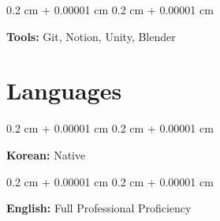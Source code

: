 \documentclass[10pt, letterpaper]{article}
\newenvironment{onecolentry}{
    \begin{adjustwidth}{
        0.2 cm + 0.00001 cm
    }{
        0.2 cm + 0.00001 cm
    }
}{
    \end{adjustwidth}
} %
\begin{document}
        \vspace{0.2 cm}

        \begin{onecolentry}
            \textbf{Tools:} Git, Notion, Unity, Blender
        \end{onecolentry}   


    \section{Languages}

        \begin{onecolentry}
            \textbf{Korean:} Native
        \end{onecolentry}

        \vspace{0.2 cm}

        \begin{onecolentry}
            \textbf{English:} Full Professional Proficiency
        \end{onecolentry}
\end{document}
